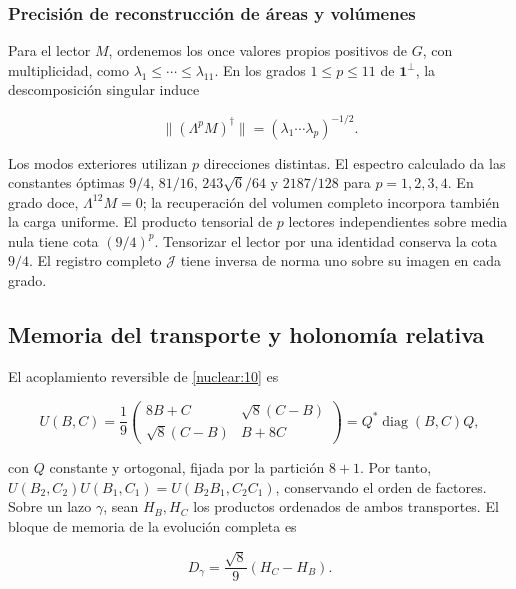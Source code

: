 \subsubsection{Precisión de reconstrucción de áreas y volúmenes}

Para el lector \(M\), ordenemos los once valores propios
positivos de \(G\), con multiplicidad, como
\(\lambda_1\le\cdots\le\lambda_{11}\).
En los grados \(1\le p\le11\) de \(\mathbf1^\perp\),
la descomposición singular induce



\begin{equation}
\|(\Lambda^pM)^\dagger\|
=(\lambda_1\cdots\lambda_p)^{-1/2}.
\label{nuc11:eq:24}
\end{equation}



Los modos exteriores utilizan \(p\) direcciones distintas.
El espectro calculado da las constantes óptimas
\(9/4\), \(81/16\), \(243\sqrt6/64\) y \(2187/128\)
para \(p=1,2,3,4\).
En grado doce, \(\Lambda^{12}M=0\); la recuperación del volumen
completo incorpora también la carga uniforme.
El producto tensorial de \(p\) lectores independientes sobre
media nula tiene cota \((9/4)^p\).
Tensorizar el lector por una identidad conserva la cota \(9/4\).
El registro completo \(\mathcal J\) tiene inversa de norma uno
sobre su imagen en cada grado.

\subsection{Memoria del transporte y holonomía relativa}

El acoplamiento reversible de \cref{nuclear:10} es



\[
U(B,C)=\frac19
\begin{pmatrix}8B+C&\sqrt8(C-B)\\
\sqrt8(C-B)&B+8C\end{pmatrix}
=Q^*\operatorname{diag}(B,C)Q,
\]



con \(Q\) constante y ortogonal, fijada por la partición \(8+1\).
Por tanto,
\(U(B_2,C_2)U(B_1,C_1)=U(B_2B_1,C_2C_1)\),
conservando el orden de factores.
Sobre un lazo \(\gamma\), sean \(H_B,H_C\) los productos
ordenados de ambos transportes.
El bloque de memoria de la evolución completa es



\[
D_\gamma=\frac{\sqrt8}{9}(H_C-H_B).
\]



